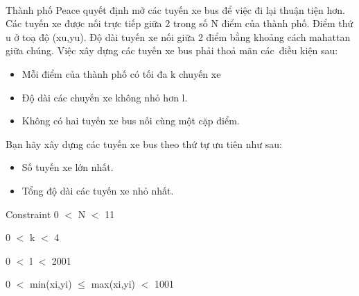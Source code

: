 

Thành phố Peace quyết định mở các tuyến xe bus để việc đi lại thuận tiện hơn. Các tuyến xe được nối trực tiếp giữa 2 trong số N điểm của thành phố. Điểm thứ u ở toạ độ (xu,yu). Độ dài tuyến xe nối giữa 2 điểm bằng khoảng cách mahattan giữa chúng. Việc xây dựng các tuyến xe bus phải thoả mãn các điều kiện sau:
\begin{itemize}
	\item Mỗi điểm của thành phố có tối đa k chuyến xe
	\item Độ dài các chuyến xe không nhỏ hơn l.
	\item Không có hai tuyến xe bus nối cùng một cặp điểm.
\end{itemize}

Bạn hãy xây dựng các tuyến xe bus theo thứ tự ưu tiên như sau:
\begin{itemize}
	\item Số tuyến xe lớn nhất.
	\item Tổng độ dài các tuyến xe nhỏ nhất.
\end{itemize}
Constraint
0 $<$ N $<$ 11

0 $<$ k $<$ 4

0 $<$ l $<$ 2001

0 $<$ min(xi,yi)  $\le$  max(xi,yi) $<$ 1001